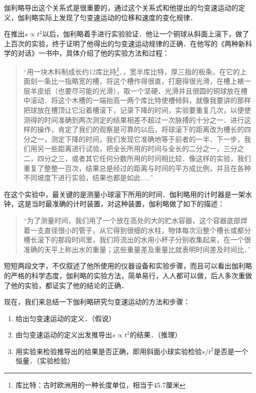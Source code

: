 伽利略导出这个关系式是很重要的，通过这个关系式和他提出的匀变速运动的定义，伽利略实际上发现了匀变速运动的位移和速度的变化规律．

在推出$s\propto t^2$以后，伽利略着手进行实验验证．他让一个铜球从斜面上滚下，做了上百次的实验，终于证明了他得出的匀变速运动规律的正确．在他写的《两种新科学的对话》一书中，具体介绍了他的实验方法和过程：

\begin{quotation}
    “用一块木料制成长约12库比持\footnote{库比特：古时欧洲用的一种长度单位，相当于45.7厘米}．，宽半库比特，厚三指的板条，在它的上面刻一条比一指略宽的槽，将这个槽作得很直，打磨得很光滑，在槽上裱一层羊皮纸（也要尽可能的光滑），取一个坚硬、光滑并且很圆的铜球放在槽中滚动．将这个木槽的一端抬高一两个库比特使槽倾斜，就像我要讲的那样把球放在槽顶让它沿着槽滚下，记录下降的时间，实验要重复几次，以便使测得的时间准确到两次测定的结果相差不超过一次脉搏的十分之一．进行这样的操作，肯定了我们的观察是可靠的以后，将球滚下的距离改为槽长的四分之一，测定下降的时间，我们发现它准确地等于前者的一半．下一步，我们用另一些距离进行试验，把全长所用的时间与全长的二分之一，三分之二，四分之三，或者其它任何分数所用的时间相比较．像这样的实验，我们重复了整整一百次，结果总是经过的距离与时间的平方成比例，并且在各种不同坡度下进行实验，结果也都是如此……”
\end{quotation}

在这个实验中，最关键的是测量小球滚下所用的时间．伽利略用的计时器是一架水钟，这是当时最准确的计时装置，对这种装置，伽利略做了如下的描述：

\begin{quotation}
    “为了测量时间，我们用了一个放在高处的大的贮水容器，这个容器底部焊着一支直径很小的管子，从它得到很细的水柱，物体每次沿整个槽长或都分槽长滚下的那段时间里，我们将流出的水用小杯子分别收集起来，在一个很准确的天平上称出水的重量；这些重量差及重量比就表明时间差及时间比．”
\end{quotation}

短短两段文字，不仅叙述了他所使用的仪器设备和实验步骤，而且可以看出伽利略的严格的科学态度，伽利略的实验方法，简单易行，人人都可以做，后人多次重做了他的实验，都证实了他的结论的正确．

现在，我们来总结一下伽利略研究匀变速运动的方法和步骤：
\begin{enumerate}
    \item 给出匀变速运动的定义．（假说）
    \item 由匀变速运动的定义出发推导出$s\propto t^2$的结果．（推理）
    \item 用实验来检验推导出的给果是否正确，即用斜面小球实验检验$s/t^2$是否是一个恒量．（实验检验）
\end{enumerate}

